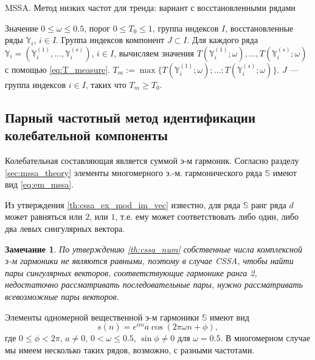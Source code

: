 \documentclass[specialist,
               substylefile = spbu.rtx,
               subf,href,colorlinks=true, 12pt]{disser}
\newtheorem{remark}{Замечание}
\begin{document}
{{\begin{algorithm}[!hhh]
\caption{MSSA. Метод низких частот для тренда: вариант с восстановленными рядами}
\label{alg:freqmssa_3}
\begin{algorithmic}[1]
\REQUIRE Значение  $0 \leqslant  \omega \leqslant 0.5$, порог $0 \leqslant T_0 \leqslant 1$, группа индексов $I$, 
восстановленные ряды $\mathbb{Y}_{i}$, $i \in I$.
\ENSURE Группа индексов компонент $J \subset I$.
\STATE  Для каждого ряда $\mathbb{Y}_{i} = (\mathbb{Y}_i^{(1)}, \ldots, \mathbb{Y}_i^{(s)})$, $i \in I$, вычисляем значения $T(\mathbb{Y}_i^{(1)}; \omega), \ldots, 
T(\mathbb{Y}_i^{(s)}; \omega)$ с помощью  \eqref{eq:T_measure}. $T_m := \max \{T(\mathbb{Y}_i^{(1)}; \omega); \ldots; 
T(\mathbb{Y}_i^{(s)}; \omega)\}$.
\STATE $J$ --- группа индексов $i \in I$, таких что $T_m \geqslant T_0$.
\end{algorithmic}
\end{algorithm}

\newpage
\subsection{Парный частотный метод идентификации колебательной компоненты}
Колебательная составляющая является суммой э-м гармоник.
Согласно разделу \ref{sec:mssa_theory} элементы многомерного э.-м. гармонического ряда $\mathbb{S}$ имеют вид \eqref{eq:em_mssa}.

Из утверждения \ref{th:cssa_ex_mod_im_vec} известно, для ряда $\mathbb{S}$ ранг ряда $d$ может равняться или $2$, или $1$, т.е. ему может соответствовать либо один, либо два левых сингулярных вектора. 

\begin{remark}
По утверждению \ref{th:cssa_num} собственные числа комплексной э-м гармоники не являются равными, поэтому в случае CSSA, чтобы найти пары сингулярных векторов, соответствующие гармонике ранга 2, недостаточно рассматривать последовательные пары, нужно рассматривать всевозможные пары векторов.
\end{remark}


Элементы одномерной вещественной э-м гармоники $\mathbb{S}$ имеют вид
\begin{equation*} 
 s(n) = e^{\alpha n} a\cos(2\pi\omega n + \phi),
\end{equation*}
где $0 \leqslant \phi < 2\pi$, $a \not = 0$, $0<\omega \leqslant 0.5$, $\sin \phi \not = 0$ для $\omega = 0.5$.
В многомерном случае мы имеем несколько таких рядов, возможно, с разными частотами. 

}}
\end{document}
